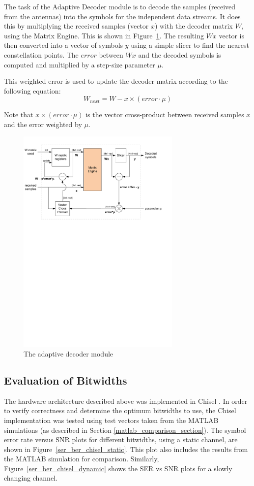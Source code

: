 \documentclass[journal]{IEEEtran}
\begin{document}
The task of the Adaptive Decoder module is to decode the samples (received from the antennas) into the symbols for the independent data streams. It does this by multiplying the received samples (vector $x$) with the decoder matrix $W$, using the Matrix Engine. This is shown in Figure~\ref{adaptive_decoder}. The resulting $Wx$ vector is then converted into a vector of symbols $y$ using a simple slicer to find the nearest constellation points. The $error$ between $Wx$ and the decoded symbols is computed and multiplied by a step-size parameter $\mu$.

This weighted error is used to update the decoder matrix according to the following equation:
\[ W_{next} = W - x \times (error \cdot \mu) \]

Note that $x \times (error \cdot \mu)$ is the vector cross-product between received samples $x$ and the error weighted by $\mu$.
\begin{figure}[!h]
\centering
\includegraphics*[width=8cm, viewport = 0 510 560 810]{images/adaptive_decoder.pdf}
\caption{The adaptive decoder module}
\label{adaptive_decoder}
\end{figure}

\subsection{Evaluation of Bitwidths}

The hardware architecture described above was implemented in Chisel \cite{chisel}. In order to verify correctness and determine the optimum bitwidths to use, the Chisel implementation was tested using test vectors taken from the MATLAB simulations (as described in Section \ref{matlab_comparison_section}). The symbol error rate versus SNR plots for different bitwidths, using a static channel, are shown in Figure~\ref{ser_ber_chisel_static}. This plot also includes the results from the MATLAB simulation for comparison. Similarly, Figure~\ref{ser_ber_chisel_dynamic} shows the SER vs SNR plots for a slowly changing channel.
\end{document}
